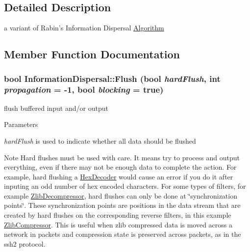 \subsection{Detailed Description}
a variant of Rabin's Information Dispersal \hyperlink{class_algorithm}{Algorithm} 

\subsection{Member Function Documentation}
\hypertarget{class_information_dispersal_aa348e2dd4609c563196f89e1cf2ad35c}{
\subsubsection[{Flush}]{\setlength{\rightskip}{0pt plus 5cm}bool InformationDispersal::Flush (bool {\em hardFlush}, \/  int {\em propagation} = {\ttfamily -\/1}, \/  bool {\em blocking} = {\ttfamily true})}}
\label{class_information_dispersal_aa348e2dd4609c563196f89e1cf2ad35c}


flush buffered input and/or output 
\begin{DoxyParams}{Parameters}
\item[{\em hardFlush}]is used to indicate whether all data should be flushed \end{DoxyParams}
\begin{DoxyNote}{Note}
Hard flushes must be used with care. It means try to process and output everything, even if there may not be enough data to complete the action. For example, hard flushing a \hyperlink{class_hex_decoder}{HexDecoder} would cause an error if you do it after inputing an odd number of hex encoded characters. For some types of filters, for example \hyperlink{class_zlib_decompressor}{ZlibDecompressor}, hard flushes can only be done at \char`\"{}synchronization points\char`\"{}. These synchronization points are positions in the data stream that are created by hard flushes on the corresponding reverse filters, in this example \hyperlink{class_zlib_compressor}{ZlibCompressor}. This is useful when zlib compressed data is moved across a network in packets and compression state is preserved across packets, as in the ssh2 protocol. 
\end{DoxyNote}


